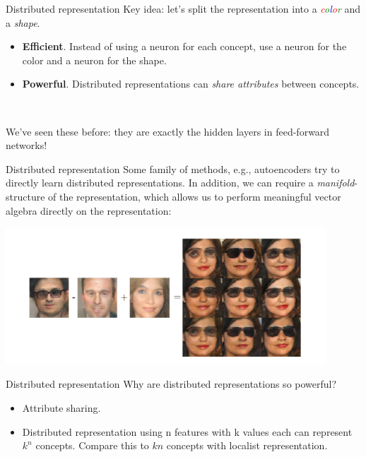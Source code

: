 \begin{frame}{Distributed representation}
Key idea: let's split the representation into a \textit{\textcolor{red}{c}\textcolor{green}{o}\textcolor{blue}{l}\textcolor{red}{o}\textcolor{green}{r}} and a \textit{shape}. \newline

\begin{itemize}
	\item \textbf{Efficient}. Instead of using a neuron for each concept, use a neuron for the color and a neuron for the shape. 
	\item \textbf{Powerful}. Distributed representations can \textit{share attributes} between concepts. 
\end{itemize} ~\newline

We've seen these before: they are exactly the hidden layers in feed-forward networks! 
\end{frame}

\begin{frame}{Distributed representation}
Some family of methods, e.g., autoencoders try to directly learn distributed representations. In addition, we can require a \textit{manifold}-structure of the representation, which allows us to perform meaningful vector algebra directly on the representation:

\centering
\includegraphics[width=0.9\textwidth]{figures/manifold_algebra.png}
\label{Radford et al. 2015}
\end{frame}

\begin{frame}{Distributed representation}
Why are distributed representations so powerful? \linebreak

\begin{itemize}
	\item Attribute sharing. 
	\item Distributed representation using n features with k values each can represent $k^n$ concepts. Compare this to $kn$ concepts with localist representation. 
\end{itemize}
\end{frame}

